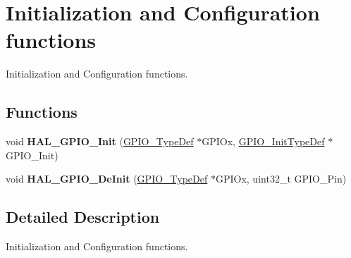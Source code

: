 \hypertarget{group___g_p_i_o___exported___functions___group1}{\section{Initialization and Configuration functions}
\label{group___g_p_i_o___exported___functions___group1}
}


Initialization and Configuration functions.  


\subsection*{Functions}
\begin{DoxyCompactItemize}
\item 
\hypertarget{group___g_p_i_o___exported___functions___group1_ga41bda93b6dd639e4905fdb1454eff98e}{void {\bfseries H\-A\-L\-\_\-\-G\-P\-I\-O\-\_\-\-Init} (\hyperlink{struct_g_p_i_o___type_def}{G\-P\-I\-O\-\_\-\-Type\-Def} $\ast$G\-P\-I\-Ox, \hyperlink{struct_g_p_i_o___init_type_def}{G\-P\-I\-O\-\_\-\-Init\-Type\-Def} $\ast$G\-P\-I\-O\-\_\-\-Init)}\label{group___g_p_i_o___exported___functions___group1_ga41bda93b6dd639e4905fdb1454eff98e}

\item 
\hypertarget{group___g_p_i_o___exported___functions___group1_gafe9c756b5aa18961032a3f8aa572959b}{void {\bfseries H\-A\-L\-\_\-\-G\-P\-I\-O\-\_\-\-De\-Init} (\hyperlink{struct_g_p_i_o___type_def}{G\-P\-I\-O\-\_\-\-Type\-Def} $\ast$G\-P\-I\-Ox, uint32\-\_\-t G\-P\-I\-O\-\_\-\-Pin)}\label{group___g_p_i_o___exported___functions___group1_gafe9c756b5aa18961032a3f8aa572959b}

\end{DoxyCompactItemize}


\subsection{Detailed Description}
Initialization and Configuration functions. 